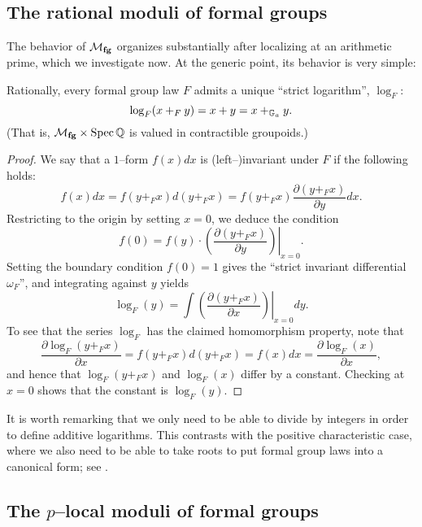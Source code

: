 \subsection{The rational moduli of formal groups}

The behavior of $\mathcal{M}_{\mathbf{fg}}$ organizes substantially after localizing at an arithmetic prime, which we investigate now.  At the generic point, its behavior is very simple:

\begin{lemma}\label{RationalFGLsHaveLogs}
Rationally, every formal group law $F$ admits a unique ``strict logarithm'', $\log_F$: \[\log_F(x +_F y) = x + y = x +_{\mathbb G_a} y.\]  (That is, $\mathcal{M}_{\mathbf{fg}} \times \operatorname{Spec} \mathbb{Q}$ is valued in contractible groupoids.)
\end{lemma}
\begin{proof}
We say that a $1$--form $f(x) dx$ is (left--)invariant under $F$ if the following holds: \[f(x) dx = f(y +_F x) d(y +_F x) = f(y +_F x) \frac{\partial(y +_F x)}{\partial y} dx.\]  Restricting to the origin by setting $x = 0$, we deduce the condition \[f(0) = f(y) \cdot \left.\left( \frac{\partial( y +_F x)}{\partial y} \right) \right|_{x=0}.\]  Setting the boundary condition $f(0) = 1$ gives the ``strict invariant differential $\omega_F$'', and integrating against $y$ yields \[\log_F(y) = \int \left. \left( \frac{\partial(y +_F x)}{\partial x} \right)\right|_{x=0} dy.\]  To see that the series $\log_F$ has the claimed homomorphism property, note that \[\frac{\partial \log_F(y +_F x)}{\partial x} = f(y +_F x) d(y +_F x) = f(x) dx = \frac{\partial \log_F(x)}{\partial x},\] and hence that $\log_F(y +_F x)$ and $\log_F(x)$ differ by a constant.  Checking at $x = 0$ shows that the constant is $\log_F(y)$.
\end{proof}

\begin{remark}
It is worth remarking that we only need to be able to divide by integers in order to define additive logarithms.  This contrasts with the positive characteristic case, where we also need to be able to take roots to put formal group laws into a canonical form; see .
\end{remark}

\subsection{The $p$--local moduli of formal groups}

